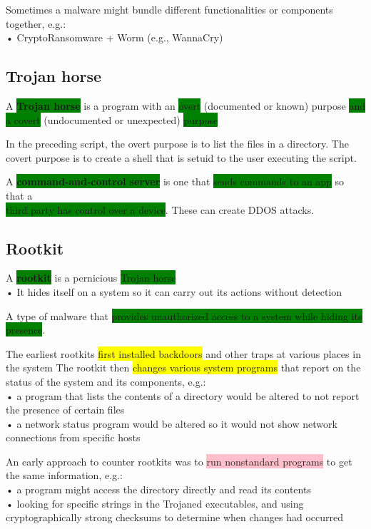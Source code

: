\documentclass[]{project_plan}
\begin{document}
Sometimes a malware might bundle different functionalities or components together, e.g.:\\
• CryptoRansomware + Worm (e.g., WannaCry)\\

\subsection{Trojan horse}

A \colorbox{green}{\textbf{Trojan horse}} is a program with an \colorbox{green}{overt} (documented or known) purpose \colorbox{green}{and a covert} (undocumented or
unexpected) \colorbox{green}{purpose}

In the preceding script, the overt purpose is to list the files in a directory. The covert purpose is to create a shell that is
setuid to the user executing the script.

A \colorbox{green}{\textbf{command-and-control server}} is one that \colorbox{green}{sends commands to an app} so
that a \\\colorbox{green}{third party has control over a device}. These can create DDOS attacks.

\subsection{Rootkit}

A \colorbox{green}{\textbf{rootkit}} is a pernicious \colorbox{green}{Trojan horse}\\
• It hides itself on a system so it can carry out its actions without detection

A type of malware that \colorbox{green}{provides unauthorized access to a system while hiding its presence}.

The earliest rootkits \colorbox{yellow}{first installed backdoors} and other traps at various places in the system
The rootkit then \colorbox{yellow}{changes various system programs} that report on the status of the system and
its components, e.g.:\\
• a program that lists the contents of a directory would be altered to not report the presence of certain
files\\
• a network status program would be altered so it would not show network connections from
specific hosts

An early approach to counter rootkits was to \colorbox{pink}{run nonstandard programs} to get the same information, e.g.:\\
• a program might access the directory directly and read its contents\\
• looking for specific strings in the Trojaned executables, and using cryptographically strong
checksums to determine when changes had occurred
\end{document}
